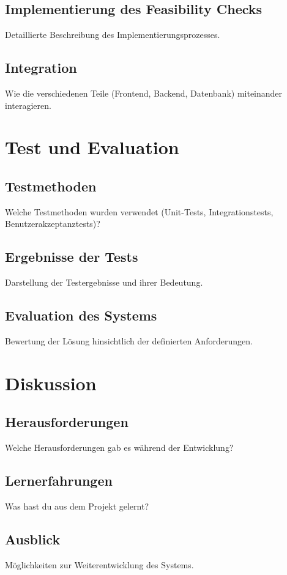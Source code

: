 \documentclass[fontsize=12pt,
parskip=half,	%
department=FakM,  %
twoside, %
DIV=15,BCOR=10mm, %
]{OTHRreprt}
\begin{document}
	\section{Implementierung des Feasibility Checks}
	Detaillierte Beschreibung des Implementierungsprozesses.
	\section{Integration}
	Wie die verschiedenen Teile (Frontend, Backend, Datenbank) miteinander interagieren.



	\chapter{Test und Evaluation}

	\section{Testmethoden}
	Welche Testmethoden wurden verwendet (Unit-Tests, Integrationstests, Benutzerakzeptanztests)?
	\section{Ergebnisse der Tests}
	Darstellung der Testergebnisse und ihrer Bedeutung.

	\section{Evaluation des Systems}
	Bewertung der Lösung hinsichtlich der definierten Anforderungen.

	\chapter{Diskussion}
	\section{Herausforderungen}
	Welche Herausforderungen gab es während der Entwicklung?
	\section{Lernerfahrungen}
	Was hast du aus dem Projekt gelernt?

	\section{Ausblick}
	Möglichkeiten zur Weiterentwicklung des Systems.
\end{document}
